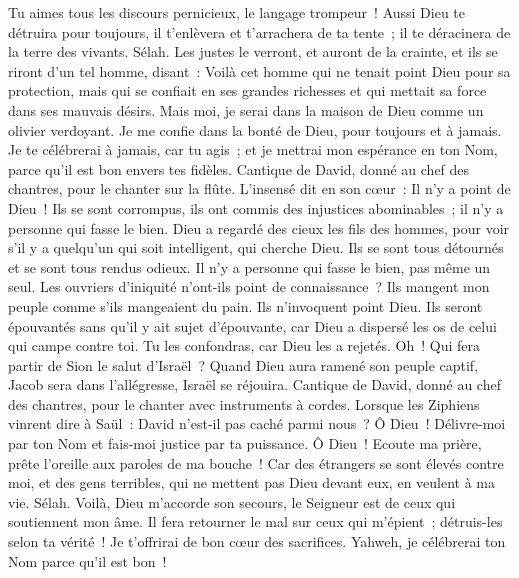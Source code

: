 \begin{multicols}{2}
Tu aimes tous les discours pernicieux, le langage trompeur~!
Aussi Dieu te détruira pour toujours, il t'enlèvera et t'arrachera de ta tente~; il te déracinera de la terre des vivants. Sélah.
Les justes le verront, et auront de la crainte, et ils se riront d'un tel homme, disant~:
Voilà cet homme qui ne tenait point Dieu pour sa protection, mais qui se confiait en ses grandes richesses et qui mettait sa force dans ses mauvais désirs.
Mais moi, je serai dans la maison de Dieu comme un olivier verdoyant. Je me confie dans la bonté de Dieu, pour toujours et à jamais.
Je te célébrerai à jamais, car tu agis~; et je mettrai mon espérance en ton Nom, parce qu'il est bon envers tes fidèles.
\VerseOne{}Cantique de David, donné au chef des chantres, pour le chanter sur la flûte.
L'insensé dit en son cœur~: Il n'y a point de Dieu~! Ils se sont corrompus, ils ont commis des injustices abominables~; il n'y a personne qui fasse le bien.
Dieu a regardé des cieux les fils des hommes, pour voir s'il y a quelqu'un qui soit intelligent, qui cherche Dieu.
Ils se sont tous détournés et se sont tous rendus odieux. Il n'y a personne qui fasse le bien, pas même un seul.
Les ouvriers d'iniquité n'ont-ils point de connaissance~? Ils mangent mon peuple comme s'ils mangeaient du pain. Ils n'invoquent point Dieu.
Ils seront épouvantés sans qu'il y ait sujet d'épouvante, car Dieu a dispersé les os de celui qui campe contre toi. Tu les confondras, car Dieu les a rejetés.
Oh~! Qui fera partir de Sion le salut d'Israël~? Quand Dieu aura ramené son peuple captif, Jacob sera dans l'allégresse, Israël se réjouira.
\VerseOne{}Cantique de David, donné au chef des chantres, pour le chanter avec instruments à cordes.
Lorsque les Ziphiens vinrent dire à Saül~: David n'est-il pas caché parmi nous~?
Ô Dieu~! Délivre-moi par ton Nom et fais-moi justice par ta puissance.
Ô Dieu~! Ecoute ma prière, prête l'oreille aux paroles de ma bouche~!
Car des étrangers se sont élevés contre moi, et des gens terribles, qui ne mettent pas Dieu devant eux, en veulent à ma vie. Sélah.
Voilà, Dieu m'accorde son secours, le Seigneur est de ceux qui soutiennent mon âme.
Il fera retourner le mal sur ceux qui m'épient~; détruis-les selon ta vérité~!
Je t'offrirai de bon cœur des sacrifices. Yahweh, je célébrerai ton Nom parce qu'il est bon~!

\end{multicols}
